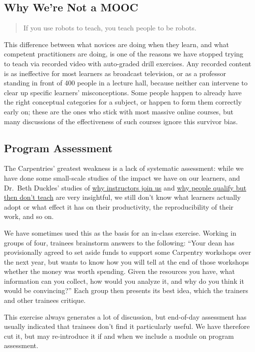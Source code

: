 \subsection{Why We're Not a MOOC}\label{why-were-not-a-mooc}

\begin{quote}
If you use robots to teach, you teach people to be robots.
\end{quote}

This difference between what novices are doing when they learn, and what
competent practitioners are doing, is one of the reasons we have stopped
trying to teach via recorded video with auto-graded drill exercises. Any
recorded content is as ineffective for most learners as broadcast
television, or as a professor standing in front of 400 people in a
lecture hall, because neither can intervene to clear up specific
learners' misconceptions. Some people happen to already have the right
conceptual categories for a subject, or happen to form them correctly
early on; these are the ones who stick with most massive online courses,
but many discussions of the effectiveness of such courses ignore this
survivor bias.

\subsection{Program Assessment}\label{program-assessment}

The Carpentries' greatest weakness is a lack of systematic assessment:
while we have done some small-scale studies of the impact we have on our
learners, and Dr.~Beth Duckles' studies of
\href{\{\{\%20site.swc_site\%20\}\}/files/bib/duckles-instructor-engagement-2016.pdf}{why
instructors join us} and
\href{\{\{\%20site.swc_site\%20\}\}/files/bib/duckles-non-instructor-report-2016.pdf}{why
people qualify but then don't teach} are very insightful, we still don't
know what learners actually adopt or what effect it has on their
productivity, the reproducibility of their work, and so on.

We have sometimes used this as the basis for an in-class exercise.
Working in groups of four, trainees brainstorm answers to the following:
``Your dean has provisionally agreed to set aside funds to support some
Carpentry workshops over the next year, but wants to know how you will
tell at the end of those workshops whether the money was worth spending.
Given the resources you have, what information can you collect, how
would you analyze it, and why do you think it would be convincing?''
Each group then presents its best idea, which the trainers and other
trainees critique.

This exercise always generates a lot of discussion, but end-of-day
assessment has usually indicated that trainees don't find it
particularly useful. We have therefore cut it, but may re-introduce it
if and when we include a module on program assessment.
